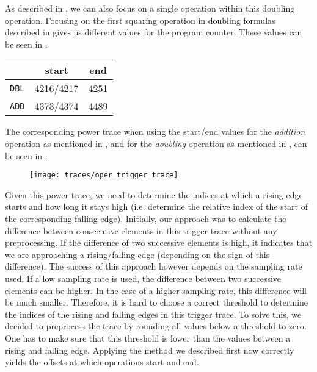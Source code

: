 As described in \cite{batina2014online}, we can also focus on a single operation within this doubling operation. 
Focusing on the first squaring operation in doubling formulas described in \cite{ladd-cfrg-4q-01} gives us different values for the program counter. These values can be seen in .
%
\begin{table}
	\centering
	\begin{tabular}{*3c}
		\toprule
		& \textbf{start} & \textbf{end} \\
		\midrule
		\texttt{DBL} & 4216/4217 & 4251 \\
		\texttt{ADD} & 4373/4374 & 4489 \\
		\bottomrule
	\end{tabular}
	\label{tbl: FourQ DBL/ADD start/end values first squaring}
\end{table}
%
The corresponding power trace when using the start/end values for the \emph{addition} operation as mentioned in , and for the \emph{doubling} operation as mentioned in , can be seen in .
%
\begin{figure}
	\centering
	\texttt{[image: traces/oper\_trigger\_trace]}
	\label{fig: oper_trigger_trace}
\end{figure}
%
Given this power trace, we need to determine the indices at which a rising edge starts and how long it stays high (i.e. determine the relative index of the start of the corresponding falling edge).
Initially, our approach was to calculate the difference between consecutive elements in this trigger trace without any preprocessing. 
If the difference of two successive elements is high, it indicates that we are approaching a rising/falling edge (depending on the sign of this difference).
The success of this approach however depends on the sampling rate used.
If a low sampling rate is used, the difference between two successive elements can be higher.
In the case of a higher sampling rate, this difference will be much smaller.
Therefore, it is hard to choose a correct threshold to determine the indices of the rising and falling edges in this trigger trace.
To solve this, we decided to preprocess the trace by rounding all values below a threshold to zero.
One has to make sure that this threshold is lower than the values between a rising and falling edge.
Applying the method we described first now correctly yields the offsets at which operations start and end.

